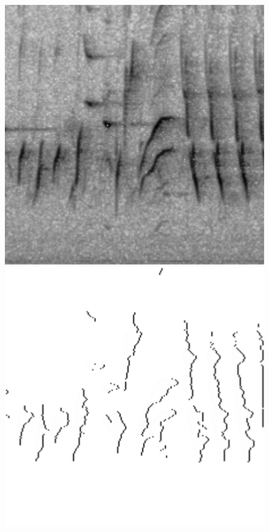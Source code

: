 \documentclass[t, xcolor={dvipsnames}]{beamer}
\begin{document}
\begin{frame}[fragile]
    \begin{figure}[!tbp]
      \centering
      \begin{minipage}[c]{0.3\textwidth}
        \includegraphics[width=\textwidth]{img/specgram}
      \end{minipage}
      \hfill
      \begin{minipage}[c]{0.3\textwidth}
        \includegraphics[width=\textwidth]{img/contours}

\end{minipage}
\end{figure}
\end{frame}
\end{document}

